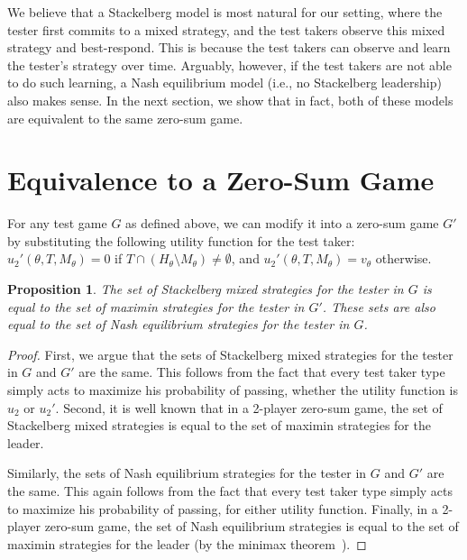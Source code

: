 \documentclass{article}
\newtheorem{proposition}{Proposition}
\begin{document}


We believe that a Stackelberg model is most natural for our setting, where
the tester first commits to a mixed strategy, and the test takers observe
this mixed strategy and best-respond.  This is because the test takers can
observe and learn the tester's strategy over time.  Arguably, however, if
the test takers are not able to do such learning, a Nash equilibrium model
(i.e., no Stackelberg leadership) also makes sense.  In the next section,
we show that in fact, both of these models are equivalent to the same
zero-sum game.





\section{Equivalence to a Zero-Sum Game}

For any test game $G$ as defined above, we can modify it into a zero-sum
game $G'$ by substituting the following utility function for the test
taker: $u_2'(\theta, T, M_\theta) = 0$ if $T \cap (H_\theta \setminus
M_\theta) \neq \emptyset$, and $u_2'(\theta, T, M_\theta) = v_\theta$
otherwise.

\begin{proposition}
  The set of Stackelberg mixed strategies for the tester in $G$ is equal to
  the set of maximin strategies for the tester in $G'$.  These sets are
  also equal to the set of Nash equilibrium strategies for the tester in
  $G$.
\label{prop:equivalence}
\end{proposition}
\begin{proof}
First, we argue that the sets of Stackelberg mixed strategies for the
tester in $G$ and $G'$ are the same.  This follows from the fact that every
test taker type simply acts to maximize his probability of passing, whether
the utility function is $u_2$ or $u_2'$.  Second, it is well known that in
a 2-player zero-sum game, the set of Stackelberg mixed strategies is equal
to the set of maximin strategies for the leader.

Similarly, the sets of Nash equilibrium strategies for the
tester in $G$ and $G'$ are the same.  This again follows from the fact that every
test taker type simply acts to maximize his probability of passing, for
either utility function.
Finally, 
in
a 2-player zero-sum game, the set of Nash equilibrium strategies is equal
to the set of maximin strategies for the leader (by the minimax theorem~\cite{Neumann28:Zur}).
\end{proof}
\end{document}
